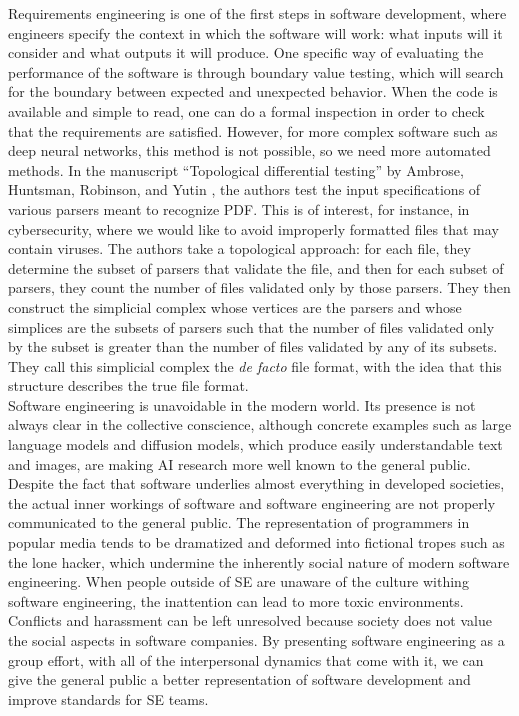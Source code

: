 \documentclass[11pt, oneside]{article}
\begin{document}
Requirements engineering is one of the first steps in software development, where engineers specify the context in which the software will work: what inputs will it consider and what outputs it will produce. One specific way of evaluating the performance of the software is through boundary value testing, which will search for the boundary between expected and unexpected behavior. When the code is available and simple to read, one can do a formal inspection in order to check that the requirements are satisfied. However, for more complex software such as deep neural networks, this method is not possible, so we need more automated methods. In the manuscript “Topological differential testing” by Ambrose, Huntsman, Robinson, and Yutin \cite{AHRY2020}, the authors test the input specifications of various parsers meant to recognize PDF. This is of interest, for instance, in cybersecurity, where we would like to avoid improperly formatted files that may contain viruses. The authors take a topological approach: for each file, they determine the subset of parsers that validate the file, and then for each subset of parsers, they count the number of files validated only by those parsers. They then construct the simplicial complex whose vertices are the parsers and whose simplices are the subsets of parsers such that the number of files validated only by the subset is greater than the number of files validated by any of its subsets. They call this simplicial complex the \textit{de facto} file format, with the idea that this structure describes the true file format.\\

Software engineering is unavoidable in the modern world. Its presence is not always clear in the collective conscience, although concrete examples such as large language models and diffusion models, which produce easily understandable text and images, are making AI research more well known to the general public. Despite the fact that software underlies almost everything in developed societies, the actual inner workings of software and software engineering are not properly communicated to the general public. The representation of programmers in popular media tends to be dramatized and deformed into fictional tropes such as the lone hacker, which undermine the inherently social nature of modern software engineering. When people outside of SE are unaware of the culture withing software engineering, the inattention can lead to more toxic environments. Conflicts and harassment can be left unresolved because society does not value the social aspects in software companies. By presenting software engineering as a group effort, with all of the interpersonal dynamics that come with it, we can give the general public a better representation of software development and improve standards for SE teams.
\end{document}

